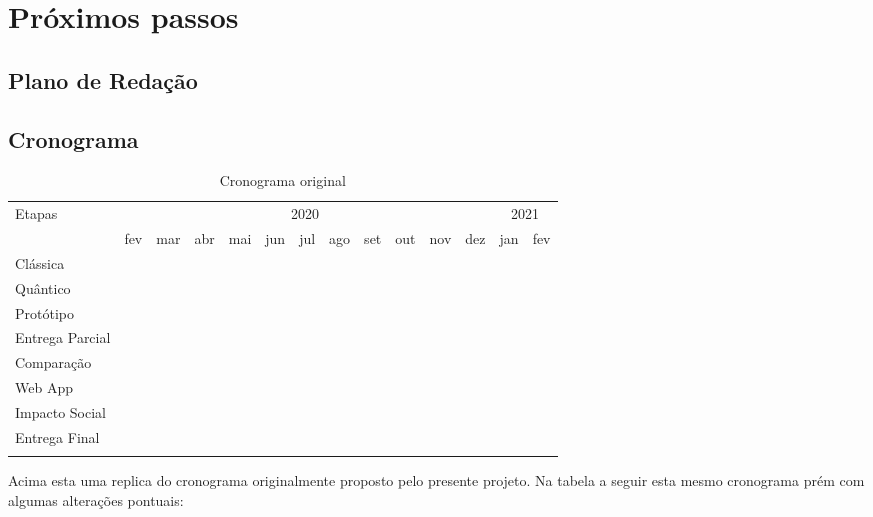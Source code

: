 \section{Próximos passos}
\subsection{Plano de Redação}
\subsection{Cronograma}
\vspace{1cm}
\begin{longtable}{ |p{2.5cm}||p{0.60cm}|p{0.60cm}|p{0.60cm}|p{0.60cm}|p{0.60cm}|p{0.60cm}|p{0.60cm}|p{0.60cm}|p{0.60cm}|p{0.60cm}|p{0.60cm}|p{0.60cm}|p{0.60cm}|  }
  \hline
  \multirow{2}{*}{Etapas} & 
  \multicolumn{11}{|c|}{2020} & 
  \multicolumn{2}{|c|}{2021} \\
        &
    fev &
    mar &
    abr &
    mai &
    jun &
    jul &
    ago &
    set &
    out &
    nov &
    dez &
    jan &
    fev \\
  \hline
  Clássica & 
  \multicolumn{2}{|c|}{\cellcolor{blue!25}} & 
  & & & & & & & & & & \\
  \hline
  Quântico & 
  \multicolumn{2}{|c|}{\cellcolor{blue!25}} & 
  & & & & & & & & & & \\
  \hline
  Protótipo & &
  \multicolumn{4}{|c|}{\cellcolor{blue!25}} & 
  & & & & & & & \\
  \hline
  Entrega Parcial & & & &
  \multicolumn{5}{|c|}{\cellcolor{blue!25}} & 
  & & & & \\
  \hline
  Comparação & & & & & &
  \multicolumn{2}{|c|}{\cellcolor{blue!25}} & 
  & & & & & \\
  \hline
  Web App & &
  \multicolumn{8}{|c|}{\cellcolor{blue!25}} & 
  & & & \\
  \hline
  Impacto Social & & & & & & & &
  \multicolumn{4}{|c|}{\cellcolor{blue!25}} & 
  & \\
  \hline
  Entrega Final & & & & & & &
  \multicolumn{7}{|c|}{\cellcolor{blue!25}} \\
  \hline
  \caption{Cronograma original}
  \label{table:5}
\end{longtable}
\vspace{1cm}

Acima esta uma replica do cronograma originalmente proposto pelo presente projeto. Na tabela a seguir esta  mesmo cronograma prém com algumas alterações pontuais:

